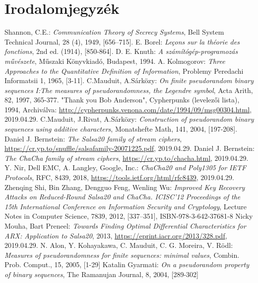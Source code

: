 \documentclass[12pt]{article}
\begin{document}
\section{Irodalomjegyzék}
	\renewcommand\refname{}
\begin{thebibliography}{3}
	Shannon, C.E.: \textit{Communication Theory of Secrecy Systems}, Bell System Technical Journal, 28 (4), 1949, [656–715].
	E. Borel: \textit{Leçons sur la théorie des fonctions}, 2nd ed. (1914), [850-864].
	D. E. Knuth: \textit{A számítógép-programozás művészete}, Műszaki Könyvkiadó, Budapest, 1994.
	A. Kolmogorov: \textit{Three Approaches to the Quantitative Definition of Information}, Problemy Peredachi Informatsii 1, 1965, [3-11].
	C.Mauduit, A.Sárközy: \textit{On finite pseudorandom binary sequences I:The measures of pseudorandomness, the Legendre symbol}, Acta Arith, 82, 1997, 365-377.
	"Thank you Bob Anderson", Cypherpunks (levelezői lista), 1994, Archiválva: \url{http://cypherpunks.venona.com/date/1994/09/msg00304.html}, 2019.04.29.
	C.Mauduit, J.Rivat, A.Sárközy: \textit{Construction of pseudorandom binary sequences using additive characters}, Monatshefte Math, 141, 2004, [197-208].
	Daniel J. Bernstein: \textit{The Salsa20 family of stream ciphers}, \url{https://cr.yp.to/snuffle/salsafamily-20071225.pdf}, 2019.04.29.
	Daniel J. Bernstein: \textit{The ChaCha family of stream ciphers}, \url{https://cr.yp.to/chacha.html}, 2019.04.29.
	Y. Nir, Dell EMC, A. Langley, Google, Inc.: \textit{ChaCha20 and Poly1305 for IETF Protocols}, RFC, 8439, 2018, \url{https://tools.ietf.org/html/rfc8439}, 2019.04.29.
	Zhenqing Shi, Bin Zhang, Dengguo Feng, Wenling Wu: \textit{Improved Key Recovery Attacks on Reduced-Round Salsa20 and ChaCha. ICISC'12 Proceedings of the 15th International Conference on Information Security and Cryptology}, Lecture Notes in Computer Science, 7839, 2012, [337–351], ISBN-978-3-642-37681-8
	Nicky Mouha, Bart Preneel: \textit{Towards Finding Optimal Differential Characteristics for ARX: Application to Salsa20}, 2013,  \url{https://eprint.iacr.org/2013/328.pdf}, 2019.04.29.
	N. Alon, Y. Kohayakawa, C. Mauduit, C. G. Moreira, V. Rödl: \textit{Measures of pseudorandomness for finite sequences: minimal values}, Combin. Prob. Comput., 15, 2005, [1-29]
	Katalin Gyarmati: \textit{On a pseudorandom property of binary sequences}, The Ramanujan Journal, 8, 2004, [289-302]
\end{thebibliography}
\end{document}
